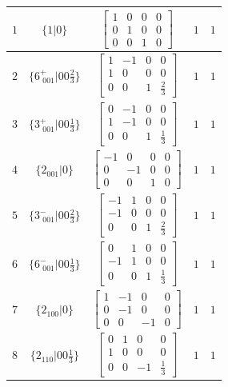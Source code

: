 \documentclass[fleqn,8pt]{jsarticle}
\begin{document}
\begin{longtable}{ccccc}
$ 1 $ & $ \{1|0\} $ & $ \begin{bmatrix} 1 & 0 & 0 & 0 \\ 0 & 1 & 0 & 0 \\ 0 & 0 & 1 & 0 \end{bmatrix} $ & $ 1 $ & $ 1 $ \\ \hline
$ 2 $ & $ \{6^{+}_{\,\,001}|0 0 \frac{2}{3}\} $ & $ \begin{bmatrix} 1 & -1 & 0 & 0 \\ 1 & 0 & 0 & 0 \\ 0 & 0 & 1 & \frac{2}{3} \end{bmatrix} $ & $ 1 $ & $ 1 $ \\ \hline
$ 3 $ & $ \{3^{+}_{\,\,001}|0 0 \frac{1}{3}\} $ & $ \begin{bmatrix} 0 & -1 & 0 & 0 \\ 1 & -1 & 0 & 0 \\ 0 & 0 & 1 & \frac{1}{3} \end{bmatrix} $ & $ 1 $ & $ 1 $ \\ \hline
$ 4 $ & $ \{2{}_{001}|0\} $ & $ \begin{bmatrix} -1 & 0 & 0 & 0 \\ 0 & -1 & 0 & 0 \\ 0 & 0 & 1 & 0 \end{bmatrix} $ & $ 1 $ & $ 1 $ \\ \hline
$ 5 $ & $ \{3^{-}_{\,\,001}|0 0 \frac{2}{3}\} $ & $ \begin{bmatrix} -1 & 1 & 0 & 0 \\ -1 & 0 & 0 & 0 \\ 0 & 0 & 1 & \frac{2}{3} \end{bmatrix} $ & $ 1 $ & $ 1 $ \\ \hline
$ 6 $ & $ \{6^{-}_{\,\,001}|0 0 \frac{1}{3}\} $ & $ \begin{bmatrix} 0 & 1 & 0 & 0 \\ -1 & 1 & 0 & 0 \\ 0 & 0 & 1 & \frac{1}{3} \end{bmatrix} $ & $ 1 $ & $ 1 $ \\ \hline
$ 7 $ & $ \{2{}_{100}|0\} $ & $ \begin{bmatrix} 1 & -1 & 0 & 0 \\ 0 & -1 & 0 & 0 \\ 0 & 0 & -1 & 0 \end{bmatrix} $ & $ 1 $ & $ 1 $ \\ \hline
$ 8 $ & $ \{2{}_{110}|0 0 \frac{1}{3}\} $ & $ \begin{bmatrix} 0 & 1 & 0 & 0 \\ 1 & 0 & 0 & 0 \\ 0 & 0 & -1 & \frac{1}{3} \end{bmatrix} $ & $ 1 $ & $ 1 $ \\ \hline

\end{longtable}
\end{document}
